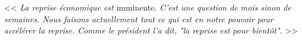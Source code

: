 \documentclass{article}
\begin{document}
\lipsum[1]

\begin{minipage}{.9\textwidth}
	<< \textit{La reprise économique est} imminente. \textit{C'est une question de mois sinon de semaines. Nous faisons actuellement tout ce qui est en notre pouvoir pour accélérer la reprise. Comme le président l'a dit, "la reprise est pour bientôt".} >>
\end{minipage}

\lipsum[1]
\end{document}
